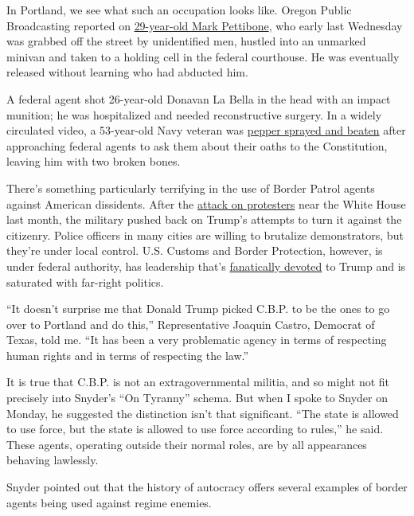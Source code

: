 In Portland, we see what such an occupation looks like. Oregon Public
Broadcasting reported on
\href{https://www.opb.org/news/article/federal-law-enforcement-unmarked-vehicles-portland-protesters/}{29-year-old
Mark Pettibone}, who early last Wednesday was grabbed off the street by
unidentified men, hustled into an unmarked minivan and taken to a
holding cell in the federal courthouse. He was eventually released
without learning who had abducted him.

A federal agent shot 26-year-old Donavan La Bella in the head with an
impact munition; he was hospitalized and needed reconstructive surgery.
In a widely circulated video, a 53-year-old Navy veteran was
\href{https://www.washingtonpost.com/nation/2020/07/20/christopher-david-portland-protest-video/}{pepper
sprayed and beaten} after approaching federal agents to ask them about
their oaths to the Constitution, leaving him with two broken bones.

There's something particularly terrifying in the use of Border Patrol
agents against American dissidents. After the
\href{https://www.nytimes.com/2020/06/02/us/politics/trump-walk-lafayette-square.html}{attack
on protesters} near the White House last month, the military pushed back
on Trump's attempts to turn it against the citizenry. Police officers in
many cities are willing to brutalize demonstrators, but they're under
local control. U.S. Customs and Border Protection, however, is under
federal authority, has leadership that's
\href{https://www.newyorker.com/news/news-desk/the-border-patrol-was-primed-for-president-trump}{fanatically
devoted} to Trump and is saturated with far-right politics.

``It doesn't surprise me that Donald Trump picked C.B.P. to be the ones
to go over to Portland and do this,'' Representative Joaquin Castro,
Democrat of Texas, told me. ``It has been a very problematic agency in
terms of respecting human rights and in terms of respecting the law.''

It is true that C.B.P. is not an extragovernmental militia, and so might
not fit precisely into Snyder's ``On Tyranny'' schema. But when I spoke
to Snyder on Monday, he suggested the distinction isn't that
significant. ``The state is allowed to use force, but the state is
allowed to use force according to rules,'' he said. These agents,
operating outside their normal roles, are by all appearances behaving
lawlessly.

Snyder pointed out that the history of autocracy offers several examples
of border agents being used against regime enemies.

